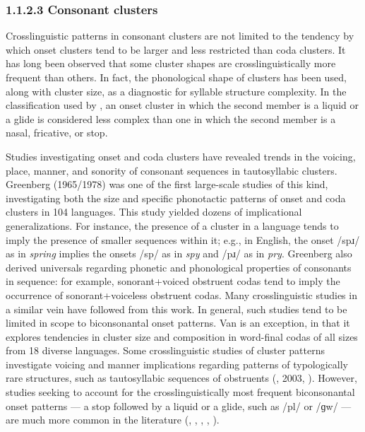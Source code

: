 \subsubsection{\textbf{1.1.2.3} \textbf{Consonant} \textbf{clusters}}

  Crosslinguistic patterns in consonant clusters are not limited to the tendency by which onset clusters tend to be larger and less restricted than coda clusters. It has long been observed that some cluster shapes are crosslinguistically more frequent than others. In fact, the phonological shape of clusters has been used, along with cluster size, as a diagnostic for syllable structure complexity. In the classification used by \citet{Maddieson2013a}, an onset cluster in which the second member is a liquid or a glide is considered less complex than one in which the second member is a nasal, fricative, or stop.

  Studies investigating onset and coda clusters have revealed trends in the voicing, place, manner, and sonority of consonant sequences in tautosyllabic clusters. Greenberg (1965/1978) was one of the first large-scale studies of this kind, investigating both the size and specific phonotactic patterns of onset and coda clusters in 104 languages. This study yielded dozens of implicational generalizations. For instance, the presence of a cluster in a language tends to imply the presence of smaller sequences within it; e.g., in English, the onset /spɹ/ as in \textit{spring} implies the onsets /sp/ as in \textit{spy} and /pɹ/ as in \textit{pry}. Greenberg also derived universals regarding phonetic and phonological properties of consonants in sequence: for example, sonorant+voiced obstruent codas tend to imply the occurrence of sonorant+voiceless obstruent codas. Many crosslinguistic studies in a similar vein have followed from this work. In general, such studies tend to be limited in scope to biconsonantal onset patterns. Van\citet{Dam2004} is an exception, in that it explores tendencies in cluster size and composition in word-final codas of all sizes from 18 diverse languages. Some crosslinguistic studies of cluster patterns investigate voicing and manner implications regarding patterns of typologically rare structures, such as tautosyllabic sequences of obstruents (\citealt{Morelli1999}, 2003, \citealt{Kreitman2008}). However, studies seeking to account for the crosslinguistically most frequent biconsonantal onset patterns — a stop followed by a liquid or a glide, such as /pl/ or /ɡw/ — are much more common in the literature (\citealt{Clements1990}, \citealt{BerentEtAl2008}, \citealt{BerentEtAl2011}, \citealt{Parker2012}, \citealt{Vennemann2012}). 

